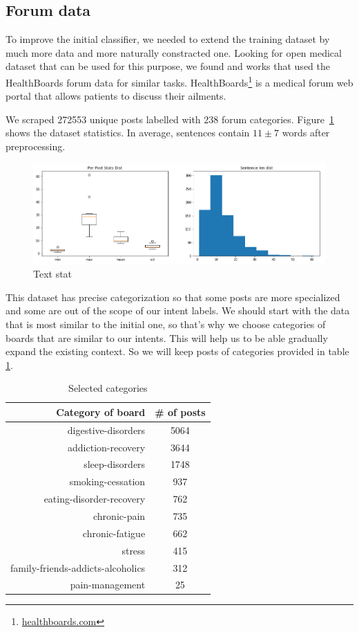 \documentclass[11pt]{article}
\begin{document}
\subsection{Forum data}
\label{subsec:forumdata}

To improve the initial classifier, we needed to extend the training
dataset by much more data and more naturally constracted one. Looking
for open medical dataset that can be used for this purpose, we found
\cite{zhang2015} and \cite{sondhi-EtAl:2010:POSTERS} works that used
the HealthBoards forum data for similar tasks. 
HealthBoards\footnote{\url{healthboards.com}} is a medical forum web portal that
allows patients to discuss their ailments.


We scraped 272553 unique posts labelled with 238 forum
categories. Figure~\ref{forum_data_stat} shows the dataset
statistics. In average, sentences contain $11\pm7$ words after
preprocessing.


 \begin{figure}[h]
 	\centering
 	\includegraphics[scale=0.4]{report3.png}
	\caption{Text stat}\label{forum_data_stat}
 \end{figure}
\FloatBarrier

This dataset has precise categorization so that some posts are more specialized and some are out of the scope of our intent labels. We should start with the data that is most similar to the initial one, so that's why we choose categories of boards that are similar to our intents. This will help us to be able gradually expand the existing context. So we will keep posts of categories provided in table \ref{cat_freq}.

\begin{table}[htb]
\centering
\begin{tabular}{ |r|c| }
\hline
Category of board &  \# of posts \\ \hline
digestive-disorders & 5064 \\ \hline
addiction-recovery & 3644 \\ \hline
sleep-disorders & 1748 \\ \hline
smoking-cessation & 937 \\ \hline
eating-disorder-recovery & 762 \\ \hline
chronic-pain & 735 \\ \hline
chronic-fatigue & 662 \\ \hline
stress & 415 \\ \hline
family-friends-addicts-alcoholics & 312 \\ \hline
pain-management & 25 \\ \hline
\end{tabular}
\caption{Selected categories}\label{cat_freq}
\end{table}
\FloatBarrier
\end{document}
